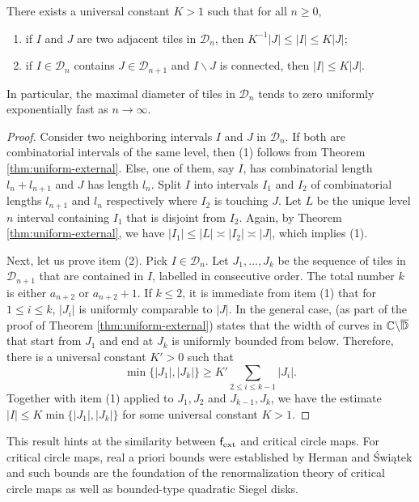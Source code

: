 \documentclass{amsart}
\begin{document}
\begin{theorem}
\label{thm:R-APB}
    There exists a universal constant $K>1$ such that for all $n \geq 0$,
    \begin{enumerate}[label = \textnormal{(\arabic*)}]
        \item if $I$ and $J$ are two adjacent tiles in $\mathcal{D}_n$, then $K^{-1}|J| \leq |I| \leq K|J|$;
        \item if $I \in \mathcal{D}_n$ contains $J \in \mathcal{D}_{n+1}$ and $I\backslash J$ is connected, then $|I| \leq K|J|$.
    \end{enumerate}
    In particular, the maximal diameter of tiles in $\mathcal{D}_n$ tends to zero uniformly exponentially fast as $n \to \infty$.
\end{theorem}

\begin{proof}
    Consider two neighboring intervals $I$ and $J$ in $\mathcal{D}_n$. If both are combinatorial intervals of the same level, then (1) follows from Theorem \ref{thm:uniform-external}. Else, one of them, say $I$, has combinatorial length $l_n+l_{n+1}$ and $J$ has length $l_n$. Split $I$ into intervals $I_1$ and $I_2$ of combinatorial lengths $l_{n+1}$ and $l_n$ respectively where $I_2$ is touching $J$. Let $L$ be the unique level $n$ interval containing $I_1$ that is disjoint from $I_2$. Again, by Theorem \ref{thm:uniform-external}, we have $|I_1| \leq |L| \asymp |I_2| \asymp |J|$, which implies (1).

    Next, let us prove item (2). Pick $I \in \mathcal{D}_n$. 
    Let $J_1,\ldots, J_{k}$ be the sequence of tiles in $\mathcal{D}_{n+1}$ that are contained in $I$, labelled in consecutive order. 
    The total number $k$ is either $a_{n+2}$ or $a_{n+2}+1$.
    If $k \leq 2$, it is immediate from item (1) that for $1 \leq i \leq k$, $|J_i|$ is uniformly comparable to $|J|$.
    In the general case, \cite[Lemma 10.5]{DL22} (as part of the proof of Theorem \ref{thm:uniform-external}) states that the width of curves in $\mathbb{C} \backslash \overline{\mathbb{D}}$ that start from $J_1$ and end at $J_k$ is uniformly bounded from below. Therefore, there is a universal constant $K'>0$ such that
    \[
    \min\{|J_1|,|J_k|\} \geq K' \sum_{2\leq i \leq k-1} |J_i|.
    \]
    Together with item (1) applied to $J_1,J_2$ and $J_{k-1}, J_k$, we have the estimate $|I| \leq K \min\{|J_1|,|J_k|\}$ for some universal constant $K>1$.
\end{proof}

This result hints at the similarity between $\mathsf{f}_{\textnormal{ext}}$ and critical circle maps. 
For critical circle maps, real a priori bounds were established by Herman and \'Swi\k{a}tek \cite{H87,Sw87} and such bounds are the foundation of the renormalization theory of critical circle maps as well as bounded-type quadratic Siegel disks.
\end{document}
